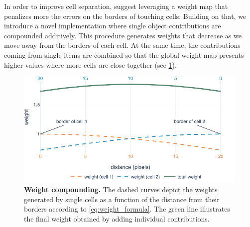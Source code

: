 In order to improve cell separation,  suggest leveraging a weight map that penalizes more the errors on the borders of touching cells.
Building on that, we introduce a novel implementation where single object contributions are compounded additively.
This procedure generates weights that decrease as we move away from the borders of each cell.
At the same time, the contributions coming from single items are combined so that the global weight map presents higher values where more cells are close together (see \cref{fig:weight_calculation}).
%
%
\begin{figure}
    \centering
    \includegraphics[width=\textwidth]{figures/130_methods/weights_calculation.pdf}
    \caption{\textbf{Weight compounding.}
    The dashed curves depict the weights generated by single cells as a function of the distance from their borders according to \cref{eq:weight_formula}.
    The green line illustrates the final weight obtained by adding individual contributions.
    }
    \label{fig:weight_calculation}
\end{figure}
